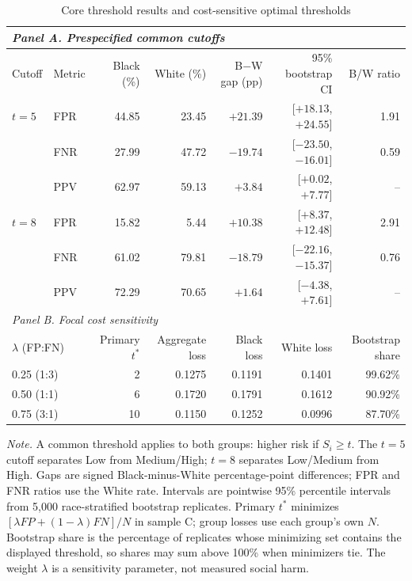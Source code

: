 \documentclass[11pt,letterpaper]{article}
\begin{document}
\begin{table}[p]
\centering
\caption{Core threshold results and cost-sensitive optimal thresholds}
\label{tab:threshold-cost-results}
\small
\setlength{\tabcolsep}{3pt}
\begin{threeparttable}
\begin{tabular*}{\textwidth}{@{\extracolsep{\fill}}llrrrrr@{}}
\toprule
\multicolumn{7}{l}{\textit{Panel A. Prespecified common cutoffs}} \\
\midrule
Cutoff & Metric & Black (\%) & White (\%) & B$-$W gap (pp) & 95\% bootstrap CI & B/W ratio \\
$t=5$ & FPR & 44.85 & 23.45 & $+21.39$ & [$+18.13$, $+24.55$] & 1.91 \\
& FNR & 27.99 & 47.72 & $-19.74$ & [$-23.50$, $-16.01$] & 0.59 \\
& PPV & 62.97 & 59.13 & $+3.84$ & [$+0.02$, $+7.77$] & -- \\
$t=8$ & FPR & 15.82 & 5.44 & $+10.38$ & [$+8.37$, $+12.48$] & 2.91 \\
& FNR & 61.02 & 79.81 & $-18.79$ & [$-22.16$, $-15.37$] & 0.76 \\
& PPV & 72.29 & 70.65 & $+1.64$ & [$-4.38$, $+7.61$] & -- \\
\midrule
\multicolumn{7}{l}{\textit{Panel B. Focal cost sensitivity}} \\
\midrule
\multicolumn{2}{l}{$\lambda$ (FP:FN)} & Primary $t^*$ & Aggregate loss & Black loss & White loss & Bootstrap share \\
\multicolumn{2}{l}{0.25 (1:3)} & 2 & 0.1275 & 0.1191 & 0.1401 & 99.62\% \\
\multicolumn{2}{l}{0.50 (1:1)} & 6 & 0.1720 & 0.1791 & 0.1612 & 90.92\% \\
\multicolumn{2}{l}{0.75 (3:1)} & 10 & 0.1150 & 0.1252 & 0.0996 & 87.70\% \\
\bottomrule
\end{tabular*}
\begin{tablenotes}[flushleft]
\footnotesize
\item \textit{Note.} A common threshold applies to both groups: higher risk if $S_i\geq t$. The $t=5$ cutoff separates Low from Medium/High; $t=8$ separates Low/Medium from High. Gaps are signed Black-minus-White percentage-point differences; FPR and FNR ratios use the White rate. Intervals are pointwise 95\% percentile intervals from 5,000 race-stratified bootstrap replicates. Primary $t^*$ minimizes $[\lambda FP+(1-\lambda)FN]/N$ in sample C; group losses use each group's own $N$. Bootstrap share is the percentage of replicates whose minimizing set contains the displayed threshold, so shares may sum above 100\% when minimizers tie. The weight $\lambda$ is a sensitivity parameter, not measured social harm.
\end{tablenotes}
\end{threeparttable}
\end{table}
\end{document}

